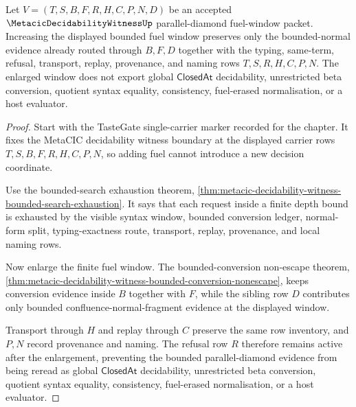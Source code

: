 \begin{theorem}
\label{thm:metacic-parallel-diamond-fuel-monotonicity}
Let $V=(T,S,B,F,R,H,C,P,N,D)$ be an accepted $\MetacicDecidabilityWitnessUp$ parallel-diamond fuel-window packet. Increasing the displayed bounded fuel window preserves only the bounded-normal evidence already routed through $B,F,D$ together with the typing, same-term, refusal, transport, replay, provenance, and naming rows $T,S,R,H,C,P,N$. The enlarged window does not export global $\mathsf{ClosedAt}$ decidability, unrestricted beta conversion, quotient syntax equality, consistency, fuel-erased normalisation, or a host evaluator.
\end{theorem}
\begin{proof}
Start with the TasteGate single-carrier marker recorded for the chapter. It fixes the MetaCIC decidability witness boundary at the displayed carrier rows $T,S,B,F,R,H,C,P,N$, so adding fuel cannot introduce a new decision coordinate.

Use the bounded-search exhaustion theorem, \autoref{thm:metacic-decidability-witness-bounded-search-exhaustion}. It says that each request inside a finite depth bound is exhausted by the visible syntax window, bounded conversion ledger, normal-form split, typing-exactness route, transport, replay, provenance, and local naming rows.

Now enlarge the finite fuel window. The bounded-conversion non-escape theorem, \autoref{thm:metacic-decidability-witness-bounded-conversion-nonescape}, keeps conversion evidence inside $B$ together with $F$, while the sibling row $D$ contributes only bounded confluence-normal-fragment evidence at the displayed window.

Transport through $H$ and replay through $C$ preserve the same row inventory, and $P,N$ record provenance and naming. The refusal row $R$ therefore remains active after the enlargement, preventing the bounded parallel-diamond evidence from being reread as global $\mathsf{ClosedAt}$ decidability, unrestricted beta conversion, quotient syntax equality, consistency, fuel-erased normalisation, or a host evaluator.
\end{proof}

